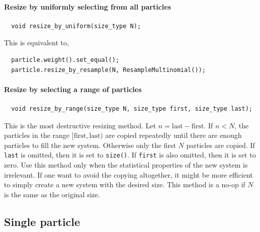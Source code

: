 \paragraph{Resize by uniformly selecting from all particles}

\begin{Verbatim}
  void resize_by_uniform(size_type N);
\end{Verbatim}
This is equivalent to,
\begin{Verbatim}
  particle.weight().set_equal();
  particle.resize_by_resample(N, ResampleMultinomial());
\end{Verbatim}

\paragraph{Resize by selecting a range of particles}

\begin{Verbatim}
  void resize_by_range(size_type N, size_type first, size_type last);
\end{Verbatim}
This is the most destructive resizing method. Let $n = \text{last} -
\text{first}$. If $n < N$, the particles in the range $[\text{first},
\text{last})$ are copied repeatedly until there are enough particles to fill
the new system. Otherwise only the first $N$ particles are copied. If
\verb|last| is omitted, then it is set to \verb|size()|. If \verb|first| is
also omitted, then it is set to zero. Use this method only when the statistical
properties of the new system is irrelevant. If one want to avoid the copying
altogether, it might be more efficient to simply create a new system with
the desired size. This method is a no-op if $N$ is the same as the original
size.

\subsection{Single particle}
\label{sub:Single particle}

